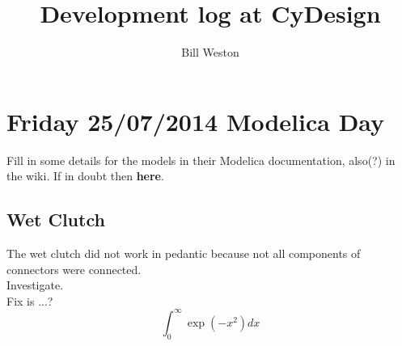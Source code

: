\documentclass[11pt, oneside]{article}   	%
\title{Development log at CyDesign}
\author{Bill Weston}
\begin{document}
\maketitle
\section{Friday 25/07/2014  Modelica Day}

Fill in some details for the models in their Modelica documentation, also(?) in the wiki.
If in doubt then {\bf here}.

\subsection{Wet Clutch}
The wet clutch did not work in pedantic because not all components of connectors were connected.\\
Investigate.\\
Fix is ...?
$$ \int_0^{\infty}\exp(-x^2) dx $$
\end{document}
